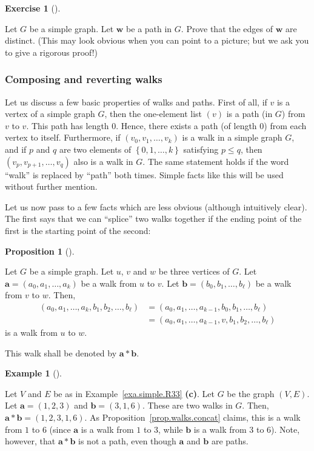 \documentclass[numbers=enddot,12pt,final,onecolumn,notitlepage]{scrartcl}%
\theoremstyle{definition}
\newtheorem{prop}[theo]{Proposition}
\newenvironment{proposition}[1][]
{\begin{prop}[#1]\begin{leftbar}}
{\end{leftbar}\end{prop}}
\newtheorem{exam}[theo]{Example}
\newenvironment{example}[1][]
{\begin{exam}[#1]\begin{leftbar}}
{\end{leftbar}\end{exam}}
\newtheorem{exmp}[theo]{Exercise}
\newenvironment{exercise}[1][]
{\begin{exmp}[#1]\begin{leftbar}}
{\end{leftbar}\end{exmp}}
\newcommand{\set}[1]{\left\{ #1 \right\}}
\newcommand{\tup}[1]{\left( #1 \right)}
\begin{document}
\begin{exercise} \label{exe.intro.path.edges-dist}
Let $G$ be a simple graph. Let $\mathbf{w}$ be a path in $G$.
Prove that the edges of $\mathbf{w}$ are distinct. (This may look
obvious when you can point to a picture; but we ask you to give a
rigorous proof!)
\end{exercise}

\subsubsection{Composing and reverting walks}

Let us discuss a few basic properties of walks and paths.
First of all, if $v$ is a vertex of a simple graph $G$, then the
one-element list $\tup{v}$ is a path (in $G$) from $v$ to $v$.
This path has length $0$.
Hence, there exists a path (of length $0$) from each vertex to
itself.
Furthermore, if $\tup{v_0, v_1, \ldots, v_k}$ is a walk in a
simple graph $G$, and if $p$ and $q$ are two elements of
$\set{0, 1, \ldots, k}$ satisfying $p \leq q$, then
$\tup{v_p, v_{p+1}, \ldots, v_q}$ also is a walk in $G$.
The same statement holds if the word ``walk'' is replaced by
``path'' both times.
Simple facts like this will be used without further mention.

Let us now pass to a few facts which are less obvious (although
intuitively clear).
The first says that we can ``splice'' two walks together if
the ending point of the first is the starting point of the
second:

\begin{proposition} \label{prop.walks.concat}
Let $G$ be a simple graph. Let $u$, $v$ and $w$ be three vertices of
$G$.
Let $\mathbf{a} = \tup{a_0, a_1, \ldots, a_k}$ be a walk from $u$ to
$v$. 
Let $\mathbf{b} = \tup{b_0, b_1, \ldots, b_\ell}$ be a walk from $v$
to $w$.
Then,
\begin{align*}
\tup{a_0, a_1, \ldots, a_k, b_1, b_2, \ldots, b_\ell}
&= \tup{a_0, a_1, \ldots, a_{k-1}, b_0, b_1, \ldots, b_\ell} \\
&= \tup{a_0, a_1, \ldots, a_{k-1}, v, b_1, b_2, \ldots, b_\ell}
\end{align*}
is a walk from $u$ to $w$.

This walk shall be denoted by $\mathbf{a} * \mathbf{b}$.
\end{proposition}

\begin{example}
Let $V$ and $E$ be as in Example~\ref{exa.simple.R33} \textbf{(c)}.
Let $G$ be the graph $\tup{V, E}$.
Let $\mathbf{a} = \tup{1, 2, 3}$ and $\mathbf{b} = \tup{3, 1, 6}$.
These are two walks in $G$.
Then, $\mathbf{a} * \mathbf{b} = \tup{1, 2, 3, 1, 6}$.
As Proposition~\ref{prop.walks.concat} claims, this is a walk
from $1$ to $6$ (since $\mathbf{a}$ is a walk from $1$ to $3$,
while $\mathbf{b}$ is a walk from $3$ to $6$).
Note, however, that $\mathbf{a} * \mathbf{b}$ is not a path,
even though $\mathbf{a}$ and $\mathbf{b}$ are paths.
\end{example}
\end{document}

